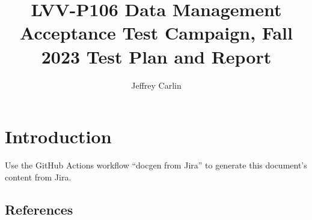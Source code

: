 \documentclass[DM,lsstdraft,toc]{lsstdoc}
\begin{document}
\def\milestoneName{Data Management Acceptance Test Campaign, Fall 2023}
\def\milestoneId{LVV-P106}
\def\product{Data Management}


\title{LVV-P106 Data Management Acceptance Test Campaign, Fall 2023 Test Plan and Report}
\setDocRef{\lsstDocType-\lsstDocNum}
\date{\vcsDate}
\author{Jeffrey Carlin}




\maketitle

\section{Introduction}
Use the GitHub Actions workflow ``docgen from Jira'' to generate this document's content from Jira.

\subsection{References}
\label{sect:references}
\renewcommand{\refname}{}




\end{document}
